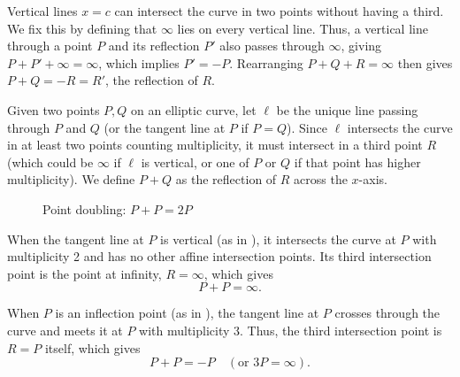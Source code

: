 Vertical lines \(x = c\) can intersect the curve in two points without having a third.
We fix this by defining that \(\infty\) lies on every vertical line.
Thus, a vertical line through a point \(P\) and its reflection \(P'\) also passes through \(\infty\), giving \(P + P' + \infty = \infty\), which implies \(P' = -P\).
Rearranging \(P + Q + R = \infty\) then gives \(P + Q = -R = R'\), the reflection of \(R\).

\begin{definition}
    Given two points \(P, Q\) on an elliptic curve, let \(\ell\) be the unique line passing through \(P\) and \(Q\) (or the tangent line at \(P\) if \(P = Q\)).
    Since \(\ell\) intersects the curve in at least two points counting multiplicity, it must intersect in a third point \(R\) (which could be \(\infty\) if \(\ell\) is vertical, or one of \(P\) or \(Q\) if that point has higher multiplicity).
    We define \(P + Q\) as the reflection of \(R\) across the \(x\)-axis.
\end{definition}

\begin{figure}[htbp]
    \centering
    \begin{minipage}{0.48\textwidth}
        \centering
        
        \caption{Point addition: \(P + Q\)}
        \label{fig:ecadd}
    \end{minipage}\hfill
    \begin{minipage}{0.48\textwidth}
        \centering
        
        \caption{Point doubling: \(P + P = 2P\)}
        \label{fig:ecdouble}
    \end{minipage}
\end{figure}

\begin{example}[Vertical tangent: \(P + P = \infty\)]
    When the tangent line at \(P\) is vertical (as in ), it intersects the curve at \(P\) with multiplicity 2 and has no other affine intersection points.
    Its third intersection point is the point at infinity, \(R = \infty\), which gives
    \[
        P + P = \infty.
    \]
\end{example}

\begin{example}[Inflection point: \(P + P = -P\)]
    When \(P\) is an inflection point (as in ), the tangent line at \(P\) crosses through the curve and meets it at \(P\) with multiplicity 3.
    Thus, the third intersection point is \(R = P\) itself, which gives
    \[
        P + P = -P \quad (\text{or } 3P = \infty).
    \]
\end{example}

